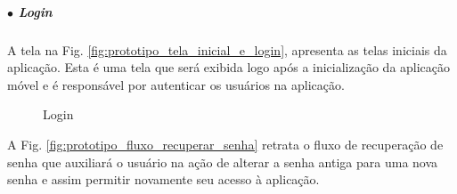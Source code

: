 \subparagraph*{$\bullet$ Login} \hfill

A tela na Fig. \ref{fig:prototipo_tela_inicial_e_login}, apresenta as telas iniciais da aplicação. Esta é uma tela que será exibida logo após a inicialização da aplicação móvel e é responsável por autenticar os usuários na aplicação. 

\begin{figure}[H]
    \centering
    \caption{Login}
\end{figure}

A Fig. \ref{fig:prototipo_fluxo_recuperar_senha} retrata o fluxo de recuperação de senha que auxiliará o usuário na ação de alterar a senha antiga para uma nova senha e assim permitir novamente seu acesso à aplicação.


